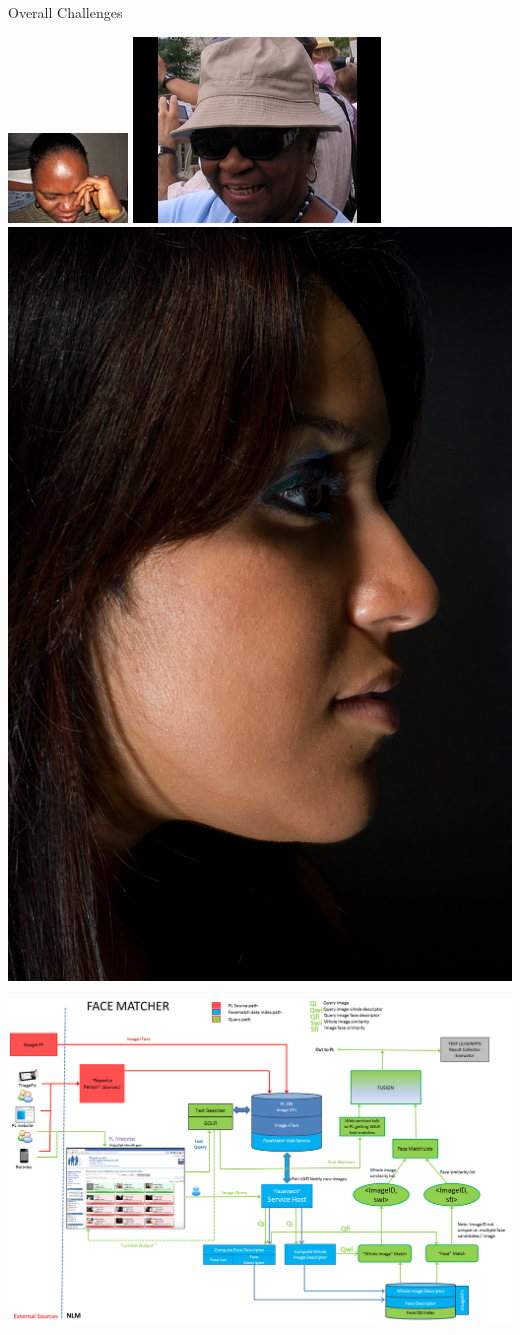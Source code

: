 \begin{xpsectionbox}{Overall Challenges}{}
\begin{minipage}{0.55\linewidth}
\begin{center}
			\vspace{0.2cm}			
			
			\includegraphics[height=0.22\linewidth]{images/HEPL_occlusion}
			\includegraphics[height=0.22\linewidth]{images/HEPL_sunglasses_hat}
			\includegraphics[height=0.22\linewidth]{images/AFLW_profile_dark}
\end{center}
\end{minipage}

\end{xpsectionbox}


\begin{xpsectionbox}{}{}

\begin{center}
\includegraphics[height=0.4\linewidth]{images/system_diagram}
\end{center}


\end{xpsectionbox}
